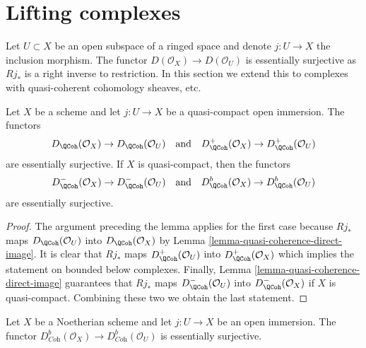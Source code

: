\section{Lifting complexes}
\label{section-lift}

\noindent
Let $U \subset X$ be an open subspace of a ringed space
and denote $j : U \to X$ the inclusion morphism. The functor
$D(\mathcal{O}_X) \to D(\mathcal{O}_U)$ is essentially surjective as
$Rj_*$ is a right inverse to restriction.
In this section we extend this to complexes with quasi-coherent cohomology
sheaves, etc.

\begin{lemma}
\label{lemma-lift-quasi-coherent}
Let $X$ be a scheme and let $j : U \to X$ be a quasi-compact
open immersion. The functors
$$
D_\QCoh(\mathcal{O}_X) \to D_\QCoh(\mathcal{O}_U)
\quad\text{and}\quad
D^+_\QCoh(\mathcal{O}_X) \to D^+_\QCoh(\mathcal{O}_U)
$$
are essentially surjective. If $X$ is quasi-compact, then the functors
$$
D^-_\QCoh(\mathcal{O}_X) \to D^-_\QCoh(\mathcal{O}_U)
\quad\text{and}\quad
D^b_\QCoh(\mathcal{O}_X) \to D^b_\QCoh(\mathcal{O}_U)
$$
are essentially surjective.
\end{lemma}

\begin{proof}
The argument preceding the lemma applies for the first case because $Rj_*$
maps $D_\QCoh(\mathcal{O}_U)$ into $D_\QCoh(\mathcal{O}_X)$
by Lemma \ref{lemma-quasi-coherence-direct-image}.
It is clear that $Rj_*$ maps
$D^+_\QCoh(\mathcal{O}_U)$ into
$D^+_\QCoh(\mathcal{O}_X)$
which implies the statement on bounded below complexes.
Finally, Lemma \ref{lemma-quasi-coherence-direct-image}
guarantees that $Rj_*$ maps
$D^-_\QCoh(\mathcal{O}_U)$ into
$D^-_\QCoh(\mathcal{O}_X)$
if $X$ is quasi-compact. Combining these two we obtain the last statement.
\end{proof}

\begin{lemma}
\label{lemma-lift-coherent}
Let $X$ be a Noetherian scheme and let $j : U \to X$ be an open immersion.
The functor
$D^b_{\textit{Coh}}(\mathcal{O}_X) \to D^b_{\textit{Coh}}(\mathcal{O}_U)$
is essentially surjective.
\end{lemma}

